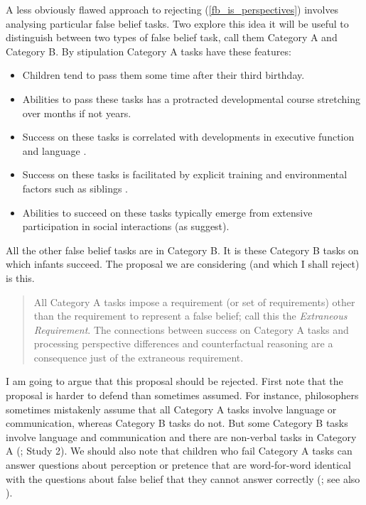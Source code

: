 \documentclass[12pt,\papersize]{extarticle}
\begin{document}
A less obviously flawed approach to rejecting (\ref{fb_is_perspectives}) involves analysing particular false belief tasks.
Two explore this idea it will be useful to distinguish between two types of false belief task, call them Category A and Category B.
By stipulation Category A tasks have these features:
\begin{itemize}
\item Children tend to pass them some time after their third birthday.
\item Abilities to pass these tasks has a protracted developmental course stretching over months if not years.
\item Success on these tasks is correlated with developments in executive function \citep[]{en_410, en_1130} and language \citep[]{en_1209}.
\item Success on these tasks is facilitated by explicit training \citep[]{en_85} and environmental factors such as siblings \citep[]{en_507, en_1299}.  
\item Abilities to succeed on these tasks typically emerge from extensive participation in social interactions (as \citealp{en_1300} suggest).
\end{itemize}
All the other false belief tasks are in Category B.
It is these Category B tasks on which infants succeed.
The proposal we are considering (and which I shall reject) is this.  
\begin{quote}
	All Category A tasks impose a requirement (or set of requirements) other than the requirement to represent a false belief;
call this the \emph{Extraneous Requirement}.
	The connections between success on Category A tasks and processing perspective differences and counterfactual reasoning are a consequence just of the extraneous requirement.
\end{quote}
I am going to argue that this proposal should be rejected.
First note that the proposal is harder to defend than sometimes assumed.
For instance, philosophers sometimes mistakenly assume that all Category A tasks involve language or communication, whereas Category B tasks do not.
But some Category B tasks involve language and communication 
\citep{Knudsen:2011fk,Song:2008qo}
and there are non-verbal tasks in Category A
(\citealp{Call:1999co}; \citealp{low:2010_preschoolers} Study 2).
We should also note that children who fail Category A tasks can answer questions about perception or pretence that are word-for-word identical with the questions about false belief that they cannot answer correctly (\citealp{Gopnik:1994cb}; see also \citealp{Cluster:1996ht}).
\end{document}

